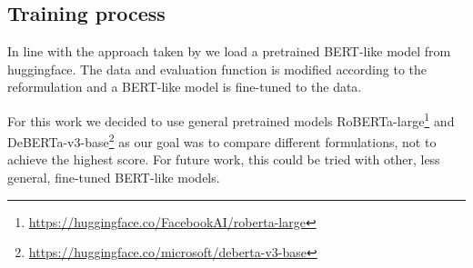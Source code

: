 \subsection{Training process}
In line with the approach taken by \citep{ails-lab} we load a pretrained BERT-like model from huggingface.
The data and evaluation function is modified according to the reformulation and a BERT-like model is fine-tuned to the data.

For this work we decided to use general pretrained models RoBERTa-large\footnote[4]{\url{https://huggingface.co/FacebookAI/roberta-large}} \citep{roberta} and DeBERTa-v3-base\footnote[5]{\url{https://huggingface.co/microsoft/deberta-v3-base}} \citep{deberta} as our goal was to compare different formulations, not to achieve the highest score.
For future work, this could be tried with other, less general, fine-tuned BERT-like models.

\pagebreak